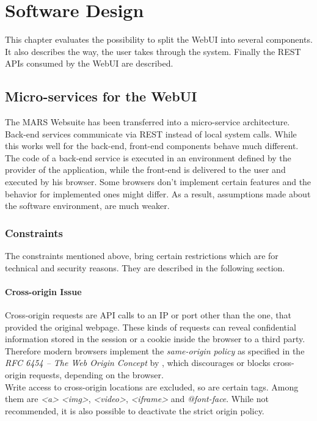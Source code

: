 
\chapter{Software Design}
This chapter evaluates the possibility to split the WebUI into several components. It also describes the way, the user takes through the system. Finally the REST APIs consumed by the WebUI are described.



\section{Micro-services for the WebUI}
\label{sec:MS_for_WebUI}
The MARS Websuite has been transferred into a micro-service architecture. Back-end services communicate via REST instead of local system calls. While this works well for the back-end, front-end components behave much different.\\
The code of a back-end service is executed in an environment defined by the provider of the application, while the front-end is delivered to the user and executed by his browser. Some browsers don't implement certain features and the behavior for implemented ones might differ. As a result, assumptions made about the software environment, are much weaker. 


\subsection{Constraints}
The constraints mentioned above, bring certain restrictions which are for technical and security reasons. They are described in the following section.

\subsubsection{Cross-origin Issue}
Cross-origin requests are API calls to an IP or port other than the one, that provided the original webpage. These kinds of requests can reveal confidential information stored in the session or a cookie inside the browser to a third party.\\
Therefore modern browsers implement the \textit{same-origin policy} as specified in the \textit{RFC 6454 -- The Web Origin Concept} by \cite{barth2011web}, which discourages or blocks cross-origin requests, depending on the browser.\\
Write access to cross-origin locations are excluded, so are certain tags. Among them are \textit{<a>} \textit{<img>}, \textit{<video>}, \textit{<iframe>} and \textit{@font-face}. While not recommended, it is also possible to deactivate the strict origin policy.

